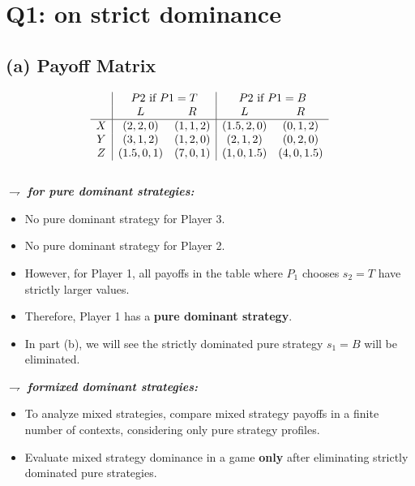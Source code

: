 \documentclass{article}
\begin{document}
\section*{Q1: on strict dominance}
\subsection*{(a) Payoff Matrix}

\[
\begin{array}{c|cc|cc}
    & \multicolumn{2}{c|}{P2 \text{ if } P1 = T} & \multicolumn{2}{c}{P2  \text{ if } P1 = B} \\
    & L & R & L & R  \\
    \hline
    X & (2,2,0) & (1,1,2) & (1.5,2,0) & (0,1,2)  \\
    Y & (3,1,2) & (1,2,0) & (2,1,2) & (0,2,0)  \\
    Z & (1.5,0,1) & (7,0,1) & (1,0, 1.5) & (4,0,1.5)  \\
\end{array}
\]
\\

$\rightharpoondown$ \textit{\textbf{for pure dominant strategies:}}
\begin{itemize}
    \item No pure dominant strategy for Player 3.
    \item No pure dominant strategy for Player 2.
    \item However, for Player 1, all payoffs in the table where \( P_1 \) chooses \( s_2 = T \) have strictly larger values.
    \item Therefore, Player 1 has a \textbf{pure dominant strategy}.
    \item In part (b), we will see the strictly dominated pure strategy \( s_1 = B \) will be eliminated.
\end{itemize}
\vspace{2mm}
\hspace{4mm}
$\rightharpoondown$ \textit{\textbf{formixed dominant strategies:}}
\begin{itemize}
    \item To analyze mixed strategies, compare mixed strategy payoffs in a finite number of contexts, considering only pure strategy profiles.
    \item Evaluate mixed strategy dominance in a game \textbf{only} after eliminating strictly dominated pure strategies.
\end{itemize}
\\
\end{document}
